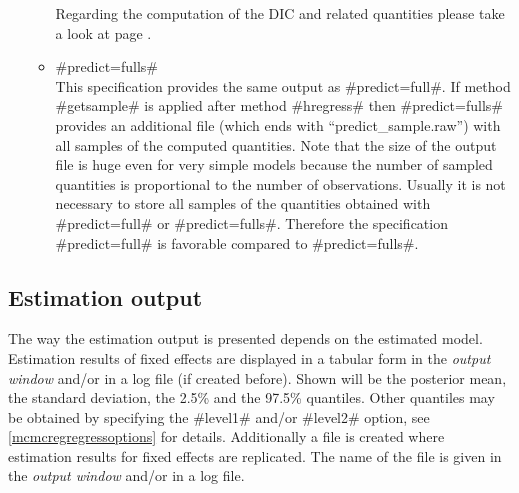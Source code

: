 \begin{itemize}
\begin{itemize}
Regarding the computation of the DIC and related quantities please take a look at page
\pageref{predict}.

\item #predict=fulls# \\
This specification provides the same output as #predict=full#. If method #getsample#
is applied after method #hregress# then #predict=fulls# provides an additional file (which ends with
``predict\_sample.raw'')
with all
samples of the computed quantities. Note that the size of the output file is huge even for very simple models
because the number of sampled quantities is proportional to the number of observations. Usually it is
not necessary to store all samples of the quantities obtained with #predict=full# or #predict=fulls#. Therefore
the specification #predict=full# is favorable compared to #predict=fulls#.


\end{itemize}

\end{itemize}



\subsection{Estimation output}

The way the estimation output is presented depends on the
estimated model. Estimation results of fixed effects are displayed
in a tabular form in the {\em output window} and/or in a log file
(if created before). Shown will be the posterior mean, the
standard deviation, the 2.5\% and the 97.5\% quantiles. Other
quantiles may be obtained by specifying the #level1# and/or
#level2# option, see \autoref{mcmcregregressoptions} for details.
Additionally a file is created where estimation results for fixed
effects are replicated. The name of the file is given in the {\em
output window} and/or in a log file.

